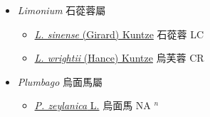 
  \begin{itemize}
 \item[] \textit{Limonium} 石蓯蓉屬
                    
  \begin{itemize}
        \item[] \href{http://www.theplantlist.org/tpl1.1/search?q=Limonium+sinense}{\textit{L. sinense} (Girard) Kuntze}   石蓯蓉 LC
        \item[] \href{http://www.theplantlist.org/tpl1.1/search?q=Limonium+wrightii}{\textit{L. wrightii} (Hance) Kuntze}   烏芙蓉 CR
  \end{itemize}
 \item[] \textit{Plumbago} 烏面馬屬
                    
  \begin{itemize}
        \item[] \href{http://www.theplantlist.org/tpl1.1/search?q=Plumbago+zeylanica}{\textit{P. zeylanica} L.}   烏面馬 NA $^n$
  \end{itemize}
  \end{itemize}
